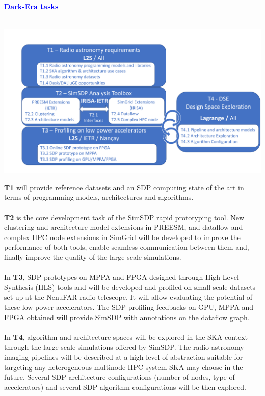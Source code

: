 \documentclass{beamer}
\renewenvironment{block}[1]{%
\begin{Sbox}%
\begin{minipage}[t]{\textwidth}
~\\
\textcolor{blue}{\quad #1}~\\
~\\%
\vspace{0.5cm}
} 
{%
\end{minipage}
\end{Sbox}\Ovalbox{\TheSbox}%
}
\begin{document}
{\begin{columns}[t]
\begin{column}{.49\linewidth}
\begin{block}{\large \textbf{Dark-Era tasks}}
        \begin{minipage}{0.95\textwidth}
 \begin{center}
    \includegraphics[width=\textwidth ]{Tasks} %
    \end{center}
    
    \textbf{T1} will provide reference datasets and an SDP computing state of the art in terms of programming models, architectures and algorithms.\\
    \\
    \textbf{T2} is the core development task of the SimSDP rapid prototyping tool. New clustering and architecture model extensions in PREESM, and dataflow and complex HPC node extensions in SimGrid will be developed to improve the performance of both tools, enable seamless communication between them and, finally improve the quality of the large scale simulations.\\
    \\
In \textbf{T3}, SDP prototypes on MPPA and FPGA designed through High Level Synthesis (HLS) tools and will be developed and profiled on small scale datasets set up at the NenuFAR radio telescope. It will allow evaluating the potential of these low power accelerators. The SDP profiling feedbacks on GPU, MPPA and FPGA obtained will provide SimSDP with annotations on the dataflow graph. \\%
\\
In \textbf{T4}, algorithm and architecture spaces will be explored in the SKA context through the large scale simulations offered by SimSDP. The radio astronomy imaging pipelines will be described at a high-level of abstraction suitable for targeting any heterogeneous multinode HPC system SKA may choose in the future. Several SDP architecture configurations (number of nodes, type of accelerators) and several SDP algorithm configurations will be then explored. 
\end{minipage}


\end{block}
\end{column}
\end{columns}}
\end{document}
